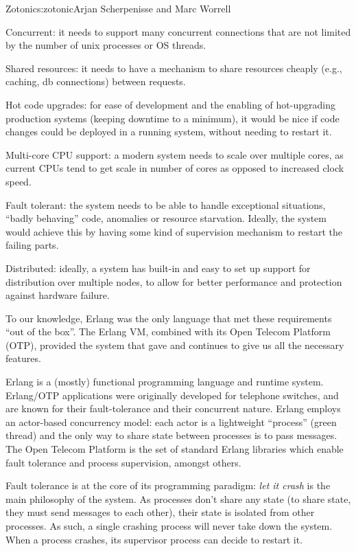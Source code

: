 \begin{aosachapter}{Zotonic}{s:zotonic}{Arjan Scherpenisse and Marc Worrell}
\begin{aosaitemize}
\item
  Concurrent: it needs to support many concurrent connections that are
  not limited by the number of unix processes or OS threads.
\item
  Shared resources: it needs to have a mechanism to share resources
  cheaply (e.g., caching, db connections) between requests.
\item
  Hot code upgrades: for ease of development and the enabling of
  hot-upgrading production systems (keeping downtime to a minimum), it
  would be nice if code changes could be deployed in a running system,
  without needing to restart it.
\item
  Multi-core CPU support: a modern system needs to scale over multiple
  cores, as current CPUs tend to get scale in number of cores as opposed
  to increased clock speed.
\item
  Fault tolerant: the system needs to be able to handle exceptional
  situations, ``badly behaving'' code, anomalies or resource starvation.
  Ideally, the system would achieve this by having some kind of
  supervision mechanism to restart the failing parts.
\item
  Distributed: ideally, a system has built-in and easy to set up support
  for distribution over multiple nodes, to allow for better performance
  and protection against hardware failure.
\end{aosaitemize}


To our knowledge, Erlang was the only language that met these
requirements ``out of the box''. The Erlang VM, combined with its Open
Telecom Platform (OTP), provided the system that gave and continues to
give us all the necessary features.

Erlang is a (mostly) functional programming language and runtime system.
Erlang/OTP applications were originally developed for telephone
switches, and are known for their fault-tolerance and their concurrent
nature. Erlang employs an actor-based concurrency model: each actor is a
lightweight ``process'' (green thread) and the only way to share state
between processes is to pass messages. The Open Telecom Platform is the
set of standard Erlang libraries which enable fault tolerance and
process supervision, amongst others.

Fault tolerance is at the core of its programming paradigm: \emph{let it
crash} is the main philosophy of the system. As processes don't share
any state (to share state, they must send messages to each other), their
state is isolated from other processes. As such, a single crashing
process will never take down the system. When a process crashes, its
supervisor process can decide to restart it.


\end{aosachapter}
